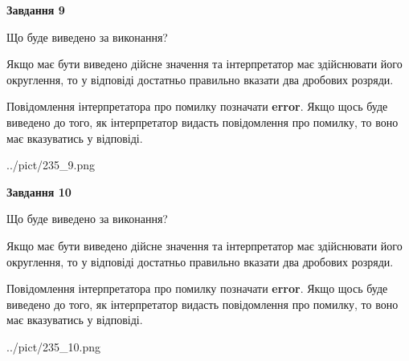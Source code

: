 \documentclass[12pt, ukrainian]{article}
\begin{document}
{\begin {Large}
{\begin {center}\textbf{Завдання 9}\end {center}}\par
Що буде виведено за виконання? \par

Якщо має бути виведено дійсне значення та інтерпретатор має здійснювати його округлення, 
то у відповіді достатньо правильно вказати два дробових розряди.

Повідомлення інтерпретатора про помилку позначати \textbf{error}.
Якщо щось буде виведено до того, як інтерпретатор видасть повідомлення про помилку, 
то воно має вказуватись у відповіді. \par

\begin{center}
	{../pict/235_9.png}
\end{center}
\newpage

{\begin {center}\textbf{Завдання 10}\end {center}}\par
Що буде виведено за виконання? \par

Якщо має бути виведено дійсне значення та інтерпретатор має здійснювати його округлення, 
то у відповіді достатньо правильно вказати два дробових розряди.

Повідомлення інтерпретатора про помилку позначати \textbf{error}.
Якщо щось буде виведено до того, як інтерпретатор видасть повідомлення про помилку, 
то воно має вказуватись у відповіді. \par

\begin{center}
	{../pict/235_10.png}
\end{center}
\newpage

\end {Large}}
\end{document}
